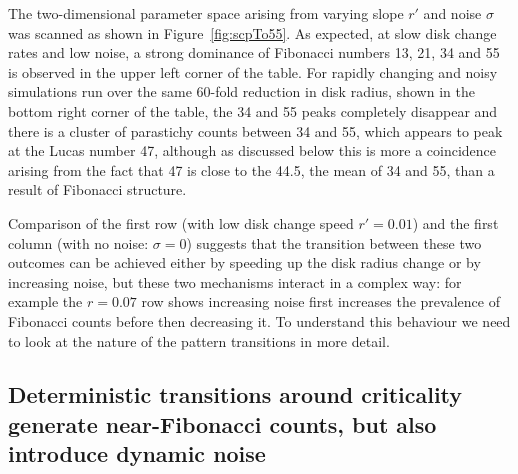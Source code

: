 The two-dimensional parameter space arising from varying slope $r'$ and noise $\sigma$ was scanned as shown in  Figure~\ref{fig:scpTo55}. As expected, at slow disk change rates and low noise, a strong dominance of Fibonacci numbers 13, 21, 34 and 55 is observed in the upper left corner of the table. For rapidly changing and noisy simulations run over the same 60-fold reduction in disk radius, shown in the bottom right corner of the table, the 34 and 55 peaks completely disappear and there is a cluster of parastichy counts between 34 and 55, which appears to peak at the Lucas number 47, although as discussed below this is more a coincidence arising from the fact that 47 is close to the 44.5, the mean of 34 and 55, than a result of Fibonacci structure. 

Comparison of the first row (with low disk change speed $r'=0.01$) and the first column (with no noise: $\sigma=0$) suggests that the transition between these two outcomes can be achieved either by speeding up the disk radius change or by increasing noise, but these two mechanisms interact in a complex way: for example the $r=0.07$ row shows increasing noise first increases the prevalence of Fibonacci counts before then decreasing it. To understand this behaviour we need to look at the nature of the pattern transitions in more detail.



\subsection{Deterministic transitions around criticality generate near-Fibonacci counts, but also introduce dynamic noise}

